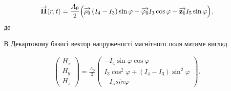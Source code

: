 %
%
%
\begin{equation} \label{eq:linear_h_cyl}
\overrightarrow{\mathbf H} (r, t) = \frac{A_0}{2} \Big( 
\overrightarrow{\mathbf \rho_0} \left( I_4 - I_3 \right) \sin \varphi +
\overrightarrow{\mathbf \varphi_0} I_3 \cos \varphi -
\overrightarrow{\mathbf z_0} I_5 \sin \varphi \Big),
\end{equation}
%
де 
%
%
%

В Декартовому базисі вектор напруженості магнітного поля матиме вигляд

\begin{equation} \begin{aligned} \label{eq:Hxyz}
\left( \begin{array}{c} H_x \\ H_y \\ H_z \end{array} \right) = 
\frac{A_0}{2} \left( \begin{array}{c}
- I_4 \sin \varphi \cos \varphi \\
I_3 \cos^2 \varphi + (I_4 - I_3) \sin^2 \varphi \\
- I_5 sin \varphi
\end{array} \right).
\end{aligned} \end{equation}

